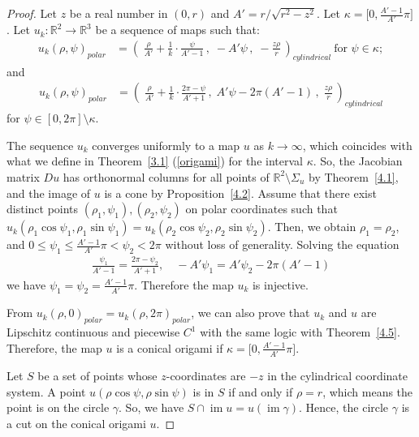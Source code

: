 \documentclass{amsart}
\theoremstyle{plain}
\theoremstyle{definition}
\theoremstyle{remark}
\DeclareMathOperator{\im}{im}
\begin{document}
\begin{proof}
Let $z$ be a real number in $(0,r)$ and $A'=r/\sqrt{r^2-z^2}$.
Let $\kappa=\bigl[0,\frac{A'-1}{A'}\pi\bigr]$.
Let $u_k \colon \mathbb{R}^2\to\mathbb{R}^3$ be a sequence of maps such that: 
\begin{align*}
u_k(\rho,\psi)_{polar} &=\left(\;\frac{\rho}{A'}+\frac1k\cdot\frac{\psi}{A'-1}\,,\;-A'\psi\,,\;-\frac{z\rho}r\,\right)_{cylindrical}%
\ \text{for }\psi\in\kappa; 
\end{align*} 
and
\begin{align*} 
u_k(\rho,\psi)_{polar} &=\left(\;\frac{\rho}{A'}+\frac1k\cdot\frac{2\pi-\psi}{A'+1}\,,\;A'\psi-2\pi(A'-1)\,,\;\frac{z\rho}r\,\right)_{cylindrical} %
\end{align*}
for $ \psi\in[0,2\pi]\setminus\kappa$.

The sequence $u_k$ converges uniformly to a map $u$ as $k\to\infty$, which coincides with what we define in Theorem~\ref{3.1} (\ref{origami}) for the interval $\kappa$.
So, the Jacobian matrix $Du$ has orthonormal columns for all points of $\mathbb{R}^2\setminus\Sigma_u$ by Theorem~\ref{4.1}, and the image of $u$ is a cone by Proposition~\ref{4.2}.
Assume that 
there exist distinct points $(\rho_1,\psi_1),(\rho_2,\psi_2)$ on polar coordinates such that $u_k(\rho_1\cos\psi_1,\rho_1\sin\psi_1)=u_k(\rho_2\cos\psi_2,\rho_2\sin\psi_2)$.
Then, we obtain $\rho_1=\rho_2$, and $0\le\psi_1\le\frac{A'-1}{A'}\pi<\psi_2<2\pi$ without loss of generality.
Solving the equation
\begin{align*}
\frac{\psi_1}{A'-1}=\frac{2\pi-\psi_2}{A'+1},\quad-A'\psi_1=A'\psi_2-2\pi(A'-1)
\end{align*}
we have $\psi_1=\psi_2=\frac{A'-1}{A'}\pi$. Therefore the map $u_k$ is injective.

From $u_k(\rho,0)_{polar}=u_k(\rho,2\pi)_{polar}$, we can also prove that $u_k$ and $u$ are Lipschitz continuous and piecewise $C^1$ with the same logic with Theorem~\ref{4.5}.
Therefore, the map $u$ is a conical origami if $\kappa=\bigl[0,\frac{A'-1}{A'}\pi\bigr]$.

Let $S$ be a set of points whose $z$-coordinates are $-z$ in the cylindrical coordinate system. %
A point $u(\rho\cos\psi,\rho\sin\psi)$ is in $S$ if and only if $\rho=r$, which means the point is on the circle $\gamma$.
So, we have $S\cap\im u=u(\im\gamma)$.
Hence, the circle $\gamma$ is a cut on the conical origami $u$. %
\end{proof}
\end{document}
